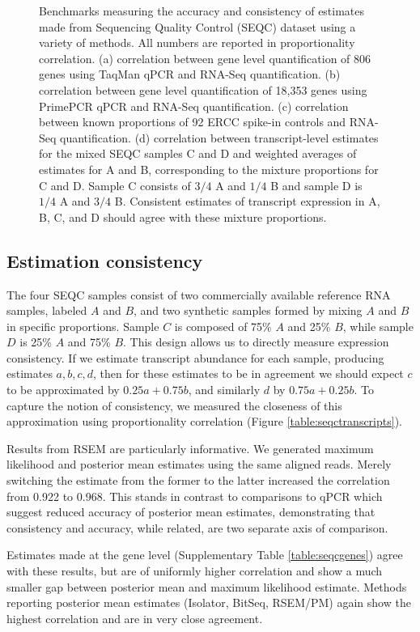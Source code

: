 \documentclass[twocolumn]{article}
\begin{document}
\begin{figure*}
\caption{
Benchmarks measuring the accuracy and consistency of estimates made from 
Sequencing Quality Control (SEQC) dataset using a variety of methods.
All numbers are reported in proportionality correlation.
(a) correlation between gene level quantification
of 806 genes using TaqMan qPCR and RNA-Seq quantification.
(b) correlation between gene level quantification
of 18,353 genes using PrimePCR qPCR and RNA-Seq quantification.
(c) correlation between known proportions of 92
ERCC spike-in controls and RNA-Seq quantification.
(d) correlation between transcript-level estimates
for the mixed SEQC samples C and D and weighted averages of estimates for A
and B, corresponding to the mixture proportions for C and D. Sample C consists of
$3/4$ A and $1/4$ B and sample D is $1/4$ A and $3/4$ B. Consistent estimates of
transcript expression in A, B, C, and D should agree with these mixture
proportions.}
\end{figure*}

\subsection{Estimation consistency}\label{estimation-consistency}

The four SEQC samples consist of two commercially available reference RNA
samples, labeled $A$ and $B$, and two synthetic samples formed by mixing $A$ and
$B$ in specific proportions. Sample $C$ is composed of 75\% $A$ and 25\% $B$,
while sample $D$ is 25\% $A$ and 75\% $B$. This design allows us to directly
measure expression consistency. If we estimate transcript abundance for each
sample, producing estimates $a, b, c, d$, then for these estimates to be in
agreement we should expect $c$ to be approximated by $0.25a + 0.75b$, and
similarly $d$ by $0.75a + 0.25b$. To capture the notion of consistency, we
measured the closeness of this approximation using proportionality correlation
(Figure \ref{table:seqctranscripts}).

Results from RSEM are particularly informative. We generated maximum
likelihood and posterior mean estimates using the same aligned reads.
Merely switching the estimate from the former to the latter increased
the correlation from 0.922 to 0.968. This stands in contrast to
comparisons to qPCR which suggest reduced accuracy of posterior mean
estimates, demonstrating that consistency and accuracy, while related,
are two separate axis of comparison.

Estimates made at the gene level (Supplementary Table \ref{table:seqcgenes})
agree with these results, but are of uniformly higher correlation and show a
much smaller gap between posterior mean and maximum likelihood estimate.
Methods reporting posterior mean estimates (Isolator, BitSeq, RSEM/PM) again
show the highest correlation and are in very close agreement.
\end{document}
